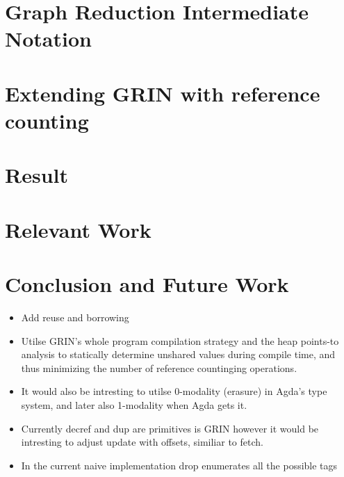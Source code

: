 \documentclass{article}
\begin{document}





\section{Graph Reduction Intermediate Notation}

\section{Extending GRIN with reference counting}

\section{Result}

\section{Relevant Work}

\section{Conclusion and Future Work}
\begin{itemize}
\item Add reuse and borrowing
\item Utilse GRIN's whole program compilation strategy and the heap points-to analysis to statically determine unshared values during compile time, and thus minimizing the number of reference countinging operations.
\item It would also be intresting to utilse 0-modality (erasure) in Agda's type system, and later also 1-modality when Agda gets it.
\item Currently decref and dup are primitives is GRIN however it would be intresting to adjust update
      with offsets, similiar to fetch.
\item In the current naive implementation drop enumerates all the possible tags 
\end{itemize}


\printbibliography
\end{document}
